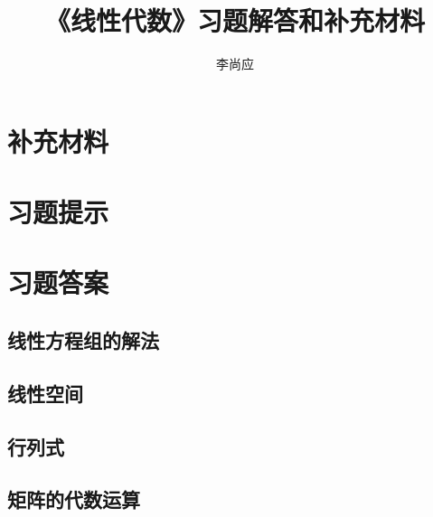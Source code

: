 \documentclass{ctexbook}
\title{《线性代数》习题解答和补充材料}
\author{李尚应}
\begin{document}
	\maketitle
	\tableofcontents
	\part*{}
	
	
	
	\part{补充材料}
	\setcounter{chapter}{0}
	\setcounter{chapter}{7}
	\part{习题提示}
	\part{习题答案}
	\setcounter{chapter}{0}
	\chapter{线性方程组的解法}
	
	\chapter{线性空间}
	\chapter{行列式}
	\chapter{矩阵的代数运算}
\end{document}
